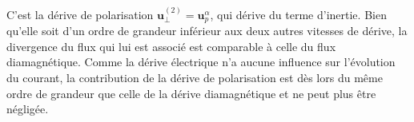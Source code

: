 \begin{refsection}
C'est la dérive de polarisation $\mathbf{u}_\perp^{(2)}=\mathbf u^\alpha_p$, qui
dérive du terme d'inertie. Bien qu'elle soit d'un ordre de grandeur inférieur aux deux autres
vitesses de dérive, la divergence du flux qui lui est associé est comparable à celle du
flux diamagnétique. Comme la dérive électrique n'a aucune influence sur
l'évolution du courant, la contribution de la dérive de polarisation est dès
lors du même ordre de grandeur que celle de la dérive diamagnétique et ne peut plus
être négligée.

%
%
\end{refsection}

